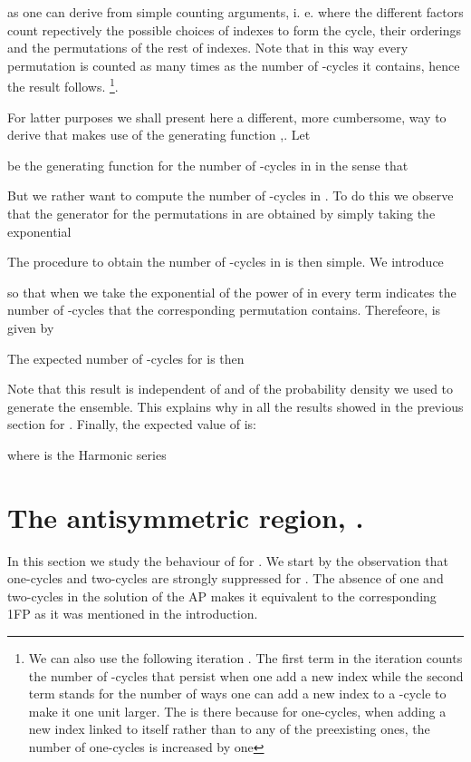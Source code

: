 \documentclass[]{iopart}
\begin{document}
as one can derive from simple counting arguments, i. e.
 where
the different factors count repectively the possible
choices of  indexes to form the cycle, their orderings
and the permutations of the rest of indexes. Note that in this 
way every permutation is counted as many times as the number of
-cycles it contains, hence the result follows. 
\footnote{We can also use the following iteration 
.
The first term in the iteration
counts the number of -cycles that
persist when one add a new index
while the second term stands for  the number of ways
one can add a new index to a -cycle to make it 
one unit larger. The  is there because
for one-cycles, when adding a new index linked to itself 
rather than to any of the preexisting ones, the number of one-cycles 
is increased by one}.



For latter purposes we shall present here
a different, more cumbersome, way to derive  that makes use of the 
generating function \cite{aSt},\cite{Riordan}. Let

be the generating function for the number of -cycles in 
in the sense that

But we rather want to compute the number of -cycles in .
To do this we observe that the generator for the
permutations in  are obtained by simply taking the exponential
 
The procedure to obtain the number
of -cycles in  is then simple. 
We introduce

so that when we take the exponential of 
the power of  in every term indicates the number
of -cycles that the corresponding permutation contains.
Therefeore,  is given by


The expected number of -cycles for
 is then

Note that this result is independent of  and of the probability 
density  we used to generate the ensemble. 
This explains why in all the results
showed in the previous section  for . Finally,
 the expected value of
 is:

where  is the Harmonic series


\section{The antisymmetric region, .}

In this section we study the behaviour
of   for . We start by the observation
that one-cycles and two-cycles are strongly suppressed
for . The absence of one and two-cycles in the 
solution of the AP makes it equivalent to the corresponding 
1FP as it was mentioned in the introduction. 
\end{document}
